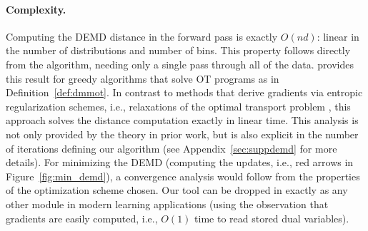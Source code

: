 \paragraph{Complexity.} Computing the DEMD distance in the forward pass is exactly $O(nd)$: linear in the number of distributions and number of bins. This property follows directly from the algorithm, needing only a single pass through all of the data. \cite{BEIN199597} provides this result for greedy algorithms that solve OT programs as in Definition~\ref{def:dmmot}. In contrast to methods that derive gradients via entropic regularization schemes, i.e., relaxations of the optimal transport problem \citep{diffpropsinkwass,difftopkOT,quantnorm}, this approach solves the distance computation exactly in linear time.
This analysis is not only provided by the theory in prior work, but is also explicit in the number of iterations defining our algorithm (see Appendix~\ref{sec:suppdemd} for more details).
For minimizing the DEMD (computing the updates, i.e., red arrows in Figure~\ref{fig:min_demd}), a convergence analysis would follow from the properties of the optimization scheme chosen. Our tool can be dropped in exactly as any other module in modern learning applications (using the observation that gradients are easily computed, i.e., $O(1)$ time to read stored dual variables). %





